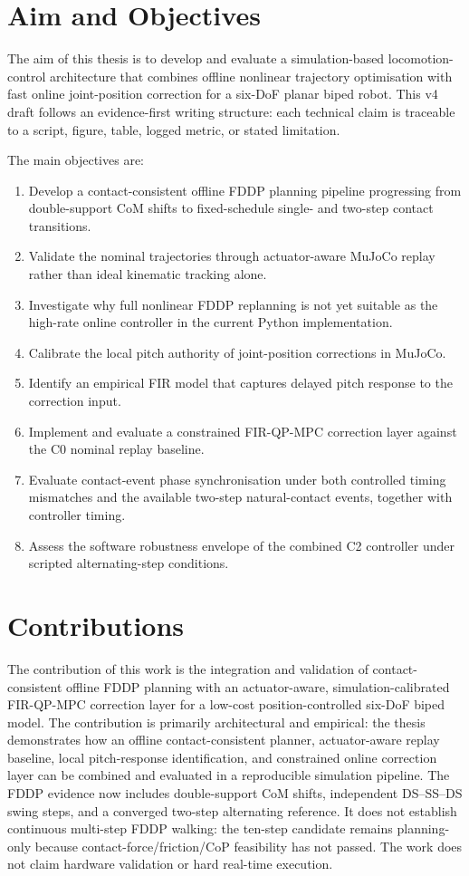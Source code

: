 \documentclass[12pt,a4paper]{report}
\begin{document}
\section{Aim and Objectives}
The aim of this thesis is to develop and evaluate a simulation-based locomotion-control architecture that combines offline nonlinear trajectory optimisation with fast online joint-position correction for a six-DoF planar biped robot. This v4 draft follows an evidence-first writing structure: each technical claim is traceable to a script, figure, table, logged metric, or stated limitation.
 
The main objectives are:
\begin{enumerate}[label=\arabic*.]
    \item Develop a contact-consistent offline FDDP planning pipeline progressing from double-support CoM shifts to fixed-schedule single- and two-step contact transitions.
    \item Validate the nominal trajectories through actuator-aware MuJoCo replay rather than ideal kinematic tracking alone.
    \item Investigate why full nonlinear FDDP replanning is not yet suitable as the high-rate online controller in the current Python implementation.
    \item Calibrate the local pitch authority of joint-position corrections in MuJoCo.
    \item Identify an empirical FIR model that captures delayed pitch response to the correction input.
    \item Implement and evaluate a constrained FIR-QP-MPC correction layer against the C0 nominal replay baseline.
    \item Evaluate contact-event phase synchronisation under both controlled timing mismatches and the available two-step natural-contact events, together with controller timing.
    \item Assess the software robustness envelope of the combined C2 controller under scripted alternating-step conditions.
\end{enumerate}
 
\section{Contributions}
The contribution of this work is the integration and validation of contact-consistent offline FDDP planning with an actuator-aware, simulation-calibrated FIR-QP-MPC correction layer for a low-cost position-controlled six-DoF biped model. The contribution is primarily architectural and empirical: the thesis demonstrates how an offline contact-consistent planner, actuator-aware replay baseline, local pitch-response identification, and constrained online correction layer can be combined and evaluated in a reproducible simulation pipeline. The FDDP evidence now includes double-support CoM shifts, independent DS--SS--DS swing steps, and a converged two-step alternating reference. It does not establish continuous multi-step FDDP walking: the ten-step candidate remains planning-only because contact-force/friction/CoP feasibility has not passed. The work does not claim hardware validation or hard real-time execution.
 
\end{document}
